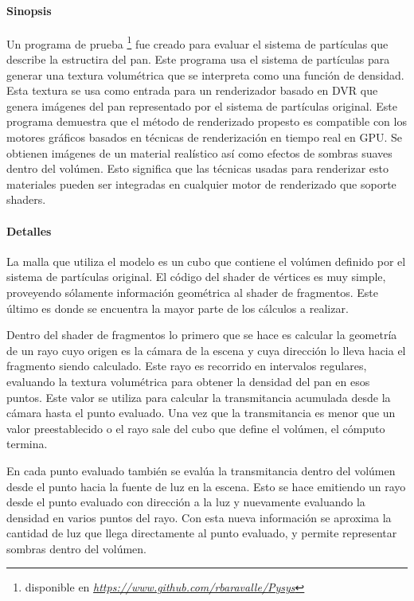 \documentclass[oneside,a4paper,spanish,links]{amca}
\begin{document}
\paragraph{Sinopsis}

Un programa de prueba \footnote{disponible en
  \emph{\url{https://www.github.com/rbaravalle/Pysys}}} fue creado
para evaluar el sistema de partículas que describe la estructira del
pan. Este programa usa el sistema de partículas para generar una
textura volumétrica que se interpreta como una función de
densidad. Esta textura se usa como entrada para un renderizador basado
en DVR que genera imágenes del pan representado por el sistema de
partículas original. Este programa demuestra que el método de
renderizado propesto es compatible con los motores gráficos basados en
técnicas de renderización en tiempo real en GPU. Se obtienen imágenes
de un material realístico así como efectos de sombras suaves dentro
del volúmen. Esto significa que las técnicas usadas para renderizar
esto materiales pueden ser integradas en cualquier motor de
renderizado que soporte shaders.

\paragraph{Detalles}

La malla que utiliza el modelo es un cubo que contiene el volúmen
definido por el sistema de partículas original. El código del shader
de vértices es muy simple, proveyendo sólamente información geométrica
al shader de fragmentos. Este último es donde se encuentra la mayor
parte de los cálculos a realizar.

Dentro del shader de fragmentos lo primero que se hace es calcular la
geometría de un rayo cuyo origen es la cámara de la escena y cuya
dirección lo lleva hacia el fragmento siendo calculado. Este rayo es
recorrido en intervalos regulares, evaluando la textura volumétrica
para obtener la densidad del pan en esos puntos. Este valor se utiliza
para calcular la transmitancia acumulada desde la cámara hasta el
punto evaluado. Una vez que la transmitancia es menor que un valor
preestablecido o el rayo sale del cubo que define el volúmen, el
cómputo termina.

En cada punto evaluado también se evalúa la transmitancia dentro del
volúmen desde el punto hacia la fuente de luz en la escena. Esto se
hace emitiendo un rayo desde el punto evaluado con dirección a la luz
y nuevamente evaluando la densidad en varios puntos del rayo. Con esta
nueva información se aproxima la cantidad de luz que llega
directamente al punto evaluado, y permite representar sombras dentro
del volúmen.
\end{document}
